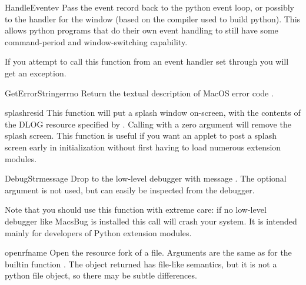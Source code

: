 \begin{funcdesc}{HandleEvent}{ev}
Pass the event record  back to the python event loop, or
possibly to the handler for the  window (based on the
compiler used to build python). This allows python programs that do
their own event handling to still have some command-period and
window-switching capability.

If you attempt to call this function from an event handler set through
 you will get an exception.
\end{funcdesc}

\begin{funcdesc}{GetErrorString}{errno}
Return the textual description of MacOS error code .
\end{funcdesc}

\begin{funcdesc}{splash}{resid}
This function will put a splash window
on-screen, with the contents of the DLOG resource specified by
. Calling with a zero argument will remove the splash
screen. This function is useful if you want an applet to post a splash screen
early in initialization without first having to load numerous
extension modules.
\end{funcdesc}

\begin{funcdesc}{DebugStr}{message }
Drop to the low-level debugger with message . The
optional  argument is not used, but can easily be
inspected from the debugger.

Note that you should use this function with extreme care: if no
low-level debugger like MacsBug is installed this call will crash your
system. It is intended mainly for developers of Python extension
modules.
\end{funcdesc}

\begin{funcdesc}{openrf}{name }
Open the resource fork of a file. Arguments are the same as for the
builtin function . The object returned has file-like
semantics, but it is not a python file object, so there may be subtle
differences.
\end{funcdesc}
